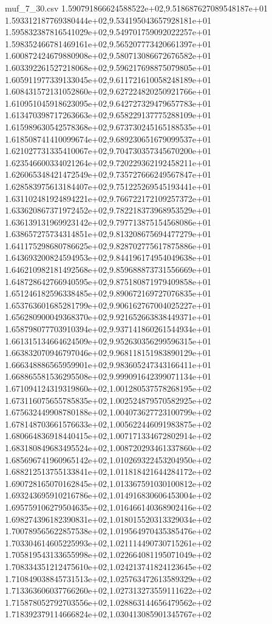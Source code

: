 \begin{filecontents*}{muf_7_30.csv}
1.590791866624588522e+02,9.518687627089548187e+01
1.593312187769380444e+02,9.534195043657928181e+01
1.595832387816541029e+02,9.549701759092022257e+01
1.598352466781469161e+02,9.565207773420661397e+01
1.600872424679880908e+02,9.580713086672676582e+01
1.603392261527218068e+02,9.596217698875079805e+01
1.605911977339133045e+02,9.611721610058248189e+01
1.608431572131052860e+02,9.627224820250921766e+01
1.610951045918623095e+02,9.642727329479657783e+01
1.613470398717263663e+02,9.658229137775288109e+01
1.615989630542578368e+02,9.673730245165188535e+01
1.618508741410099674e+02,9.689230651679099537e+01
1.621027731335410067e+02,9.704730357345670200e+01
1.623546600334021264e+02,9.720229362192458211e+01
1.626065348421472549e+02,9.735727666249567847e+01
1.628583975613184407e+02,9.751225269545193441e+01
1.631102481924894221e+02,9.766722172109257372e+01
1.633620867371972452e+02,9.782218373968953529e+01
1.636139131969923142e+02,9.797713875154568086e+01
1.638657275734314851e+02,9.813208675694477279e+01
1.641175298680786625e+02,9.828702775617875886e+01
1.643693200824594953e+02,9.844196174954049638e+01
1.646210982181492568e+02,9.859688873731556669e+01
1.648728642766940595e+02,9.875180871979409858e+01
1.651246182596338485e+02,9.890672169727076835e+01
1.653763601685281799e+02,9.906162767004025227e+01
1.656280900049368370e+02,9.921652663838449371e+01
1.658798077703910394e+02,9.937141860261544934e+01
1.661315134664624509e+02,9.952630356299596315e+01
1.663832070946797046e+02,9.968118151983890129e+01
1.666348886565959901e+02,9.983605247343166411e+01
1.668865581536295508e+02,9.999091642399071134e+01
1.671094124319319860e+02,1.001280537578268195e+02
1.673116075655785835e+02,1.002524879570582925e+02
1.675632449908780188e+02,1.004073627723100799e+02
1.678148703661576633e+02,1.005622446091983875e+02
1.680664836918440415e+02,1.007171334672802914e+02
1.683180849683495524e+02,1.008720293461337860e+02
1.685696741960965142e+02,1.010269322453204950e+02
1.688212513755133841e+02,1.011818421644284172e+02
1.690728165070162845e+02,1.013367591030100812e+02
1.693243695910216786e+02,1.014916830606453004e+02
1.695759106279504635e+02,1.016466140368902416e+02
1.698274396182390831e+02,1.018015520313329034e+02
1.700789565622857538e+02,1.019564970435385476e+02
1.703304614605225993e+02,1.021114490730715261e+02
1.705819543133655998e+02,1.022664081195071049e+02
1.708334351212475610e+02,1.024213741824123645e+02
1.710849038845731513e+02,1.025763472613589329e+02
1.713363606037766260e+02,1.027313273559111622e+02
1.715878052792703556e+02,1.028863144656479562e+02
1.718392379114666824e+02,1.030413085901345767e+02

\end{filecontents*}
